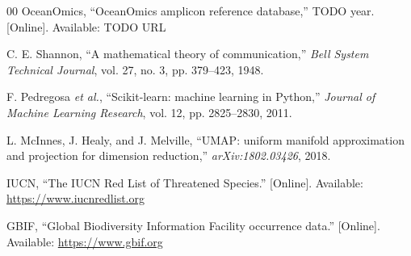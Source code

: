 \documentclass[conference]{IEEEtran}
\begin{document}
\begin{thebibliography}{00}
OceanOmics, ``OceanOmics amplicon reference database,'' TODO year. [Online].
Available: TODO URL

 C. E. Shannon, ``A mathematical theory of
communication,'' \emph{Bell System Technical Journal}, vol. 27, no. 3, pp.
379--423, 1948.

 F. Pedregosa \emph{et al.}, ``Scikit-learn: machine
learning in Python,'' \emph{Journal of Machine Learning Research}, vol. 12,
pp. 2825--2830, 2011.

 L. McInnes, J. Healy, and J. Melville, ``UMAP: uniform
manifold approximation and projection for dimension reduction,''
\emph{arXiv:1802.03426}, 2018.

 IUCN, ``The IUCN Red List of Threatened Species.'' [Online].
Available: \url{https://www.iucnredlist.org}

 GBIF, ``Global Biodiversity Information Facility occurrence
data.'' [Online]. Available: \url{https://www.gbif.org}

\end{thebibliography}
\end{document}
